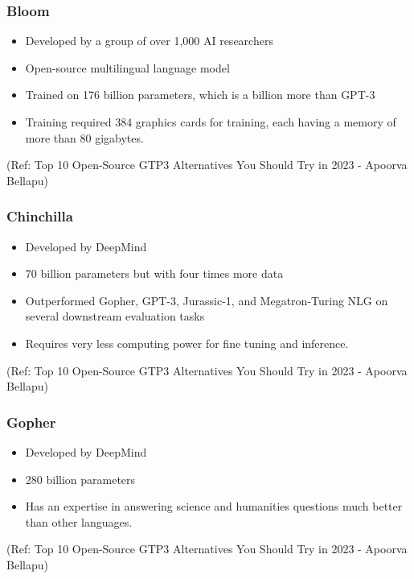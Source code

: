 \begin{frame}[fragile]\frametitle{Bloom}

\begin{itemize}
\item Developed by a group of over 1,000 AI researchers
\item Open-source multilingual language model
\item Trained on 176 billion parameters, which is a billion more than GPT-3 
\item Training required 384 graphics cards for training, each having a memory of more than 80 gigabytes.
\end{itemize}	 

\tiny{(Ref: Top 10 Open-Source GTP3 Alternatives You Should Try in 2023 - Apoorva Bellapu)}
\end{frame}

\begin{frame}[fragile]\frametitle{Chinchilla}

\begin{itemize}
\item Developed by DeepMind
\item 70 billion parameters but with four times more data
\item Outperformed Gopher, GPT-3, Jurassic-1, and Megatron-Turing NLG on several downstream evaluation tasks
\item Requires very less computing power for fine tuning and inference.
\end{itemize}	 

\tiny{(Ref: Top 10 Open-Source GTP3 Alternatives You Should Try in 2023 - Apoorva Bellapu)}
\end{frame}

\begin{frame}[fragile]\frametitle{Gopher}

\begin{itemize}
\item Developed by DeepMind
\item 280 billion parameters
\item Has an expertise in answering science and humanities questions much better than other languages.
\end{itemize}	 

\tiny{(Ref: Top 10 Open-Source GTP3 Alternatives You Should Try in 2023 - Apoorva Bellapu)}
\end{frame}

